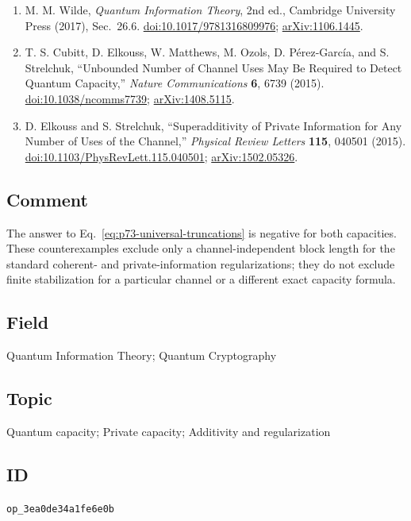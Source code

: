 \begin{enumerate}[label={},leftmargin=4.8em,labelsep=0.5em]
  \footnotesize
  \item[\textup{[Wil17]}]\label{ref:p73-wilde}
  M. M. Wilde, \emph{Quantum Information Theory}, 2nd ed., Cambridge
  University Press (2017), Sec.~26.6.
  \href{https://doi.org/10.1017/9781316809976}{doi:10.1017/9781316809976};
  \href{https://arxiv.org/abs/1106.1445}{arXiv:1106.1445}.

  \item[\textup{[CEM+15]}]\label{ref:p73-cubitt-et-al}
  T. S. Cubitt, D. Elkouss, W. Matthews, M. Ozols, D. P\'erez-Garc\'ia, and
  S. Strelchuk, ``Unbounded Number of Channel Uses May Be Required to Detect
  Quantum Capacity,'' \emph{Nature Communications} \textbf{6}, 6739 (2015).
  \href{https://doi.org/10.1038/ncomms7739}{doi:10.1038/ncomms7739};
  \href{https://arxiv.org/abs/1408.5115}{arXiv:1408.5115}.

  \item[\textup{[ES15]}]\label{ref:p73-elkouss-strelchuk}
  D. Elkouss and S. Strelchuk, ``Superadditivity of Private Information for
  Any Number of Uses of the Channel,'' \emph{Physical Review Letters}
  \textbf{115}, 040501 (2015).
  \href{https://doi.org/10.1103/PhysRevLett.115.040501}{doi:10.1103/PhysRevLett.115.040501};
  \href{https://arxiv.org/abs/1502.05326}{arXiv:1502.05326}.
\end{enumerate}

\subsection*{Comment}

The answer to Eq.~\eqref{eq:p73-universal-truncations} is negative for both
capacities.  These counterexamples exclude only a channel-independent block
length for the standard coherent- and private-information regularizations;
they do not exclude finite stabilization for a particular channel or a
different exact capacity formula.

\subsection*{Field}

Quantum Information Theory; Quantum Cryptography

\subsection*{Topic}

Quantum capacity; Private capacity; Additivity and regularization

\subsection*{ID}

\texttt{op\_3ea0de34a1fe6e0b}
